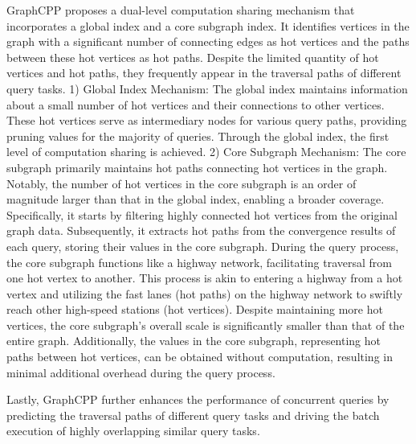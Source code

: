 \documentclass[lettersize,journal]{IEEEtran} %
\begin{document}
GraphCPP proposes a dual-level computation sharing mechanism that incorporates a global index and a core subgraph index. It identifies vertices in the graph with a significant number of connecting edges as hot vertices and the paths between these hot vertices as hot paths. Despite the limited quantity of hot vertices and hot paths, they frequently appear in the traversal paths of different query tasks. 1) Global Index Mechanism: The global index maintains information about a small number of hot vertices and their connections to other vertices. These hot vertices serve as intermediary nodes for various query paths, providing pruning values for the majority of queries. Through the global index, the first level of computation sharing is achieved. 2) Core Subgraph Mechanism: The core subgraph primarily maintains hot paths connecting hot vertices in the graph. Notably, the number of hot vertices in the core subgraph is an order of magnitude larger than that in the global index, enabling a broader coverage. Specifically, it starts by filtering highly connected hot vertices from the original graph data. Subsequently, it extracts hot paths from the convergence results of each query, storing their values in the core subgraph. During the query process, the core subgraph functions like a highway network, facilitating traversal from one hot vertex to another. This process is akin to entering a highway from a hot vertex and utilizing the fast lanes (hot paths) on the highway network to swiftly reach other high-speed stations (hot vertices). Despite maintaining more hot vertices, the core subgraph's overall scale is significantly smaller than that of the entire graph. Additionally, the values in the core subgraph, representing hot paths between hot vertices, can be obtained without computation, resulting in minimal additional overhead during the query process.

Lastly, GraphCPP further enhances the performance of concurrent queries by predicting the traversal paths of different query tasks and driving the batch execution of highly overlapping similar query tasks.
\end{document}
